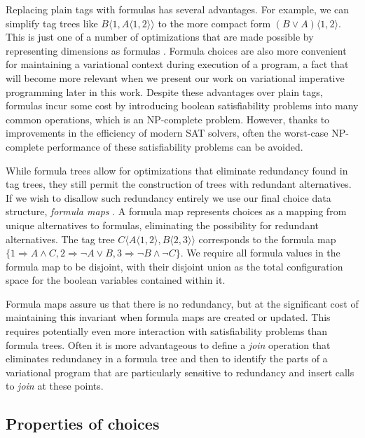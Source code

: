 \documentclass[letterpaper,10pt,onecolumn]{article}
\newcommand{\tagtree}[3]{#1 \langle #2, #3 \rangle}
\begin{document}
Replacing plain tags with formulas has several advantages. For example, we can simplify tag trees like
$\tagtree{B}{1}{\tagtree{A}{1}{2}}$ to the more compact form $\tagtree{(B \vee A)}{1}{2}$. This is just
one of a number of optimizations that are made possible by representing dimensions as formulas
\cite{walkingshaw2014projectional,hubbard2016formula}. Formula choices are also more convenient
for maintaining a variational context during execution of a program, a fact that will become
more relevant when we present our work on variational imperative programming later in
this work. Despite these advantages over plain tags, formulas incur some cost by introducing boolean
satisfiability problems into many common operations, which is an NP-complete problem. However, thanks to improvements in the
efficiency of modern SAT solvers, often the worst-case NP-complete performance of these satisfiability
problems can be avoided.

While formula trees allow for optimizations that eliminate redundancy found in tag trees,
they still permit the construction of trees with redundant alternatives. If we wish to disallow such
redundancy entirely we use our final choice data structure,
\emph{formula maps} \cite{walkingshaw2014variational}.
A formula map represents choices as a mapping from unique alternatives to formulas, eliminating the
possibility for redundant alternatives. The tag tree $\tagtree{C}{\tagtree{A}{1}{2}}{\tagtree{B}{2}{3}}$
corresponds to the formula map 
$\{1 \Rightarrow A \wedge C, 2 \Rightarrow \neg A \vee B, 3 \Rightarrow \neg B \wedge \neg C\}$.
We require all formula values in the formula map to be disjoint, with their disjoint union as the total
configuration space for the boolean variables contained within it. %

Formula maps assure us that there is no redundancy, but at the significant cost of maintaining this
invariant when formula maps are created or updated. This requires potentially even more interaction
with satisfiability problems than formula trees. Often it is more advantageous to define a \emph{join}
operation that eliminates redundancy in a formula tree and then to identify the parts of
a variational program that are particularly sensitive to redundancy and insert calls to \emph{join}
at these points.  

\subsection{Properties of choices}
\end{document}
